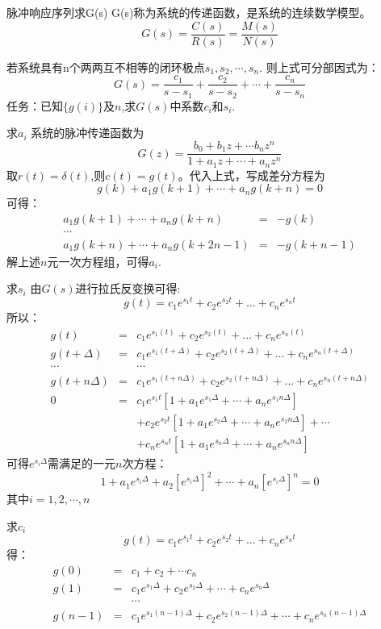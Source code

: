 \begin{frame}{脉冲响应序列求G(s)}
G(s)称为系统的传递函数，是系统的连续数学模型。
$$
G(s)=\frac{C(s)}{R(s)}=\frac{M(s)}{N(s)}
$$

若系统具有n个两两互不相等的闭环极点$s_1,s_2,\cdots,s_n$.
则上式可分部因式为：
$$
G(s)=\frac{c_1}{s-s_1}+\frac{c_2}{s-s_2}+\cdots+\frac{c_n}{s-s_n}
$$
任务：已知$\{g(i)\}$及$n$,求$G(s)$中系数$c_i$和$s_i$.
\end{frame}

\begin{frame}{求$a_i$}
系统的脉冲传递函数为
$$
G(z)=\frac{b_0+b_1 z+ \cdots b_n z^n}{1+a_1 z + \cdots + a_n z^n}
$$
取$r(t)=\delta(t)$,则$c(t)=g(t)$。代入上式，写成差分方程为
$$
g(k)+a_1g(k+1)+\cdots+a_ng(k+n) = 0
$$
可得：
\begin{eqnarray*}
a_1g(k+1)+\cdots+a_ng(k+n) &=& -g(k) \\
\cdots &&  \\
a_1g(k+n)+\cdots+a_ng(k+2n-1) &=& -g(k+n-1)
\end{eqnarray*}
解上述$n$元一次方程组，可得$a_i$.
\end{frame}

\begin{frame}{求$s_i$}
由$G(s)$进行拉氏反变换可得:
$$
g(t)=c_1 e^{s_1 t} + c_2 e^{s_2 t} + ... + c_n e^{s_n t}
$$
所以：
\begin{eqnarray*}
g(t) &=& c_1 e^{s_1 (t)} + c_2 e^{s_2 (t)} + ... + c_n e^{s_n (t)}  \\
g(t+\Delta) &=& c_1 e^{s_1 (t+\Delta)} + c_2 e^{s_2 (t+\Delta)} + ... + c_n e^{s_n (t+\Delta)}  \\
\cdots && \cdots \\
g(t+n\Delta) &=& c_1 e^{s_1 (t+n\Delta)} + c_2 e^{s_2 (t+n\Delta)} + ... + c_n e^{s_n (t+n\Delta)}  \\
0 &=& c_1 e ^{s_1 t}[1+a_1 e^{s_1 \Delta} + \cdots + a_n e^{s_1 n\Delta}]  \\
&& +c_2 e ^{s_2 t}[1+a_1 e^{s_2 \Delta} + \cdots + a_n e^{s_2 n\Delta}] +\cdots  \\
&& +c_n e ^{s_n t}[1+a_1 e^{s_n \Delta} + \cdots + a_n e^{s_n n\Delta}] 
\end{eqnarray*}
可得$e^{s_i\Delta}$需满足的一元$n$次方程：
$$
1+a_1 e^{s_i \Delta} +a_2 [e^{s_i\Delta}]^2+\cdots+a_n[e^{s_i\Delta}]^n=0
$$
其中$i=1,2,\cdots,n$
\end{frame}

\begin{frame}{求$c_i$}
$$
g(t)=c_1 e^{s_1 t} + c_2 e^{s_2 t} + ... + c_n e^{s_n t}
$$
得：
\begin{eqnarray*}
g(0)&=& c_1 + c_2 + \cdots c_n \\
g(1)&=& c_1 e^{s_1 \Delta} + c_2 e^{s_2 \Delta}+\cdots+c_n e^{s_n \Delta} \\
&& \cdots \\
g(n-1)&=& c_1 e^{s_1 (n-1)\Delta} + c_2 e^{s_2 (n-1)\Delta}+\cdots+c_n e^{s_n (n-1)\Delta} \\
\end{eqnarray*}
\end{frame}

